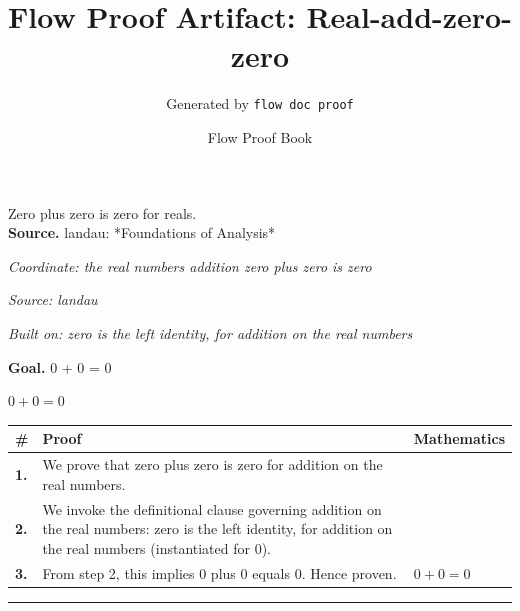 \documentclass[11pt]{article}
\title{Flow Proof Artifact: Real-add-zero-zero}
\author{Generated by \texttt{flow doc proof}}
\date{Flow Proof Book}
\theoremstyle{definition}
\begin{document}
\maketitle
Zero plus zero is zero for reals.\\[0.5em]
\textbf{Source.} landau: *Foundations of Analysis*\\[0.5em]
\bigskip
{}\par
\smallskip\noindent\textit{Coordinate: the real numbers \cdot addition \cdot zero plus zero is zero}\par
\smallskip\noindent\textit{Source: landau}\par
\smallskip\noindent\textit{Built on: zero is the left identity, for addition on the real numbers}\par
\medskip
\noindent\textbf{Goal.} 0 + 0 = 0\par
\noindent$\displaystyle 0 + 0 = 0$\par
\medskip
\noindent
\begin{tabular}{@{} >{\raggedright\arraybackslash}p{} >{\raggedright\arraybackslash}p{} >{\raggedleft\arraybackslash}p{} @{}}
\textbf{\#} & \textbf{Proof} & \textbf{Mathematics} \\
\midrule
\textbf{1.} & We prove that zero plus zero is zero for addition on the real numbers. & \\[0.45em]
\textbf{2.} & We invoke the definitional clause governing addition on the real numbers: zero is the left identity, for addition on the real numbers (instantiated for 0). & \\[0.45em]
\textbf{3.} & From step 2, this implies 0 plus 0 equals 0. Hence proven. & $\displaystyle 0 + 0 = 0$ \\[0.45em]
\bottomrule
\end{tabular}
\label{thm:Real-addition-zero_plus_zero_is_zero}
\par\medskip\hrule
\end{document}
